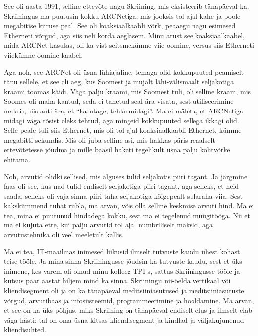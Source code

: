 
See oli  aasta 1991, selline ettevõte nagu Skriining, mis 
eksisteerib tänapäeval ka. Skriiningus ma puutusin kokku ARCNetiga, mis jooksis 
tol ajal kahe ja poole megabitise kiiruse peal. See oli koaksiaalkaabli võrk, 
peaaegu nagu esimesed Etherneti võrgud, aga siis neli korda aeglasem. Minu 
arust see koaksiaalkaabel, mida ARCNet kasutas, oli ka vist seitsmekümne viie 
oomine, versus siis Etherneti viiekümne oomine kaabel. 

Aga noh, see ARCNet oli  üsna lühiajaline, temaga olid kokkupuuted peamiselt  
tänu sellele, et see oli  aeg, kus Soomest ja mujalt lähi-välismaalt 
seljakotiga kraami toomas käidi. Väga palju kraami, mis Soomest tuli, oli 
selline kraam, mis Soomes oli maha kantud, seda ei tahetud seal ära visata, 
sest  utiliseerimine maksis, siis anti ära, et \enquote{kasutage, tehke 
midagi}. Ma ei mäleta, et ARCNetiga midagi väga tõsist oleks tehtud, aga 
mingeid kokkupuuted sellega ikkagi olid. Selle peale tuli siis Ethernet, mis 
oli tol ajal koaksiaalkaabli Ethernet, kümme megabitti sekundis. Mis oli juba 
selline asi, mis hakkas päris reaalselt ettevõtetesse jõudma ja mille baasil 
hakati tegelikult üsna palju  kohtvõrke ehitama.


Noh, arvutid olidki sellised, mis alguses tulid seljakotis piiri tagant. Ja 
järgmine faas oli see, kus  nad tulid endiselt seljakotiga piiri tagant, aga 
selleks, et neid saada, selleks oli vaja sinna piiri taha seljakotiga 
kõigepealt sularaha viia. Sest kakskümmend tuhat rubla, ma arvan, võis olla  
selline keskmise arvuti hind. Ma ei tea, mina ei puutunud hindadega kokku, sest 
ma ei tegelenud müügitööga. Nii et ma ei kujuta ette, kui palju  arvutid tol 
ajal  numbriliselt maksid, aga arvutustehnika oli veel meeletult kallis.


Ma ei tea, IT-maailmas inimesed liikusid ilmselt tutvuste kaudu ühest kohast 
teise tööle. Ja mina sinna Skriiningusse jõudsin ka  tutvuste 
kaudu, sest et üks inimene, kes varem oli olnud minu kolleeg TPI-s, sattus 
Skriiningusse tööle ja kutsus paar aastat hiljem mind ka sinna. 
Skriiningu nii-öelda vertikaal või kliendisegment oli ja on ka tänapäeval 
meditsiiniasutused ja meditsiiniasutuste võrgud, arvutibaas ja infosüsteemid, 
programmeerimine ja hooldamine. Ma arvan, et see on ka üks põhjus, miks 
Skriining on tänapäeval  endiselt elus ja ilmselt elab väga hästi: tal on oma 
üsna kitsas kliendisegment ja kindlad ja väljakujunenud kliendisuhted.

